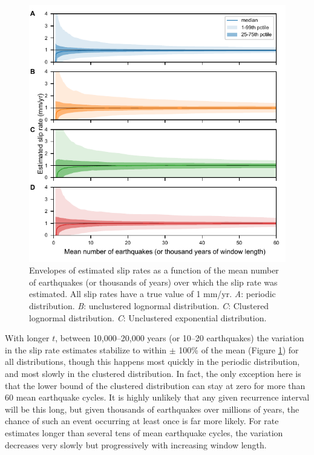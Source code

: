 \documentclass[se]{copernicus}
\begin{document}
\begin{figure}[t]
  \includegraphics[width=12cm]{./figures/slip_rate_envelopes.pdf}
  \caption{Envelopes of estimated slip rates as a function of the mean number 
  of earthquakes (or thousands of years) over which the slip rate was 
  estimated. All slip rates have a true value of 1 mm/yr. \emph{A}: periodic 
  distribution. \emph{B}: unclustered lognormal distribution. \emph{C}: 
  Clustered lognormal distribution. \emph{C}: Unclustered exponential 
  distribution. \label{slip_rate_envelopes}}
\end{figure}


With longer \(t\), between 10,000--20,000 years (or 10--20 earthquakes)
the variation in the slip rate estimates stabilize to within \(\pm\)
100\% of the mean (Figure \ref{slip_rate_envelopes}) for all
distributions, though this happens most quickly in the periodic
distribution, and most slowly in the clustered distribution. In fact,
the only exception here is that the lower bound of the clustered
distribution can stay at zero for more than 60 mean earthquake cycles. It is
highly unlikely that any given recurrence interval will be this long, but
given thousands of earthquakes over millions of years, the chance of such an
event occurring at least once is far more likely. For rate estimates longer
than several tens of mean earthquake cycles, the variation decreases very
slowly but progressively with increasing window length.
\end{document}
